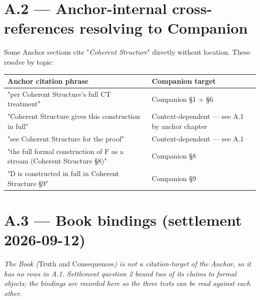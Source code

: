 \documentclass[11pt, openany]{book}
\newcommand{\sectionbreak}{\clearpage}
\begin{document}
\section{A.2 --- Anchor-internal cross-references resolving to Companion}

Some Anchor sections cite "\textit{Coherent Structure}" directly without location. These resolve by topic:

\begingroup\setlength{\tabcolsep}{3pt}\renewcommand{\arraystretch}{1.15}\footnotesize
\begin{center}
\begin{tabular}{p{2.69in} p{1.70in}}
\toprule
Anchor citation phrase & Companion target \\
\midrule
"per Coherent Structure's full CT treatment" & Companion §1 + §6 \\
"Coherent Structure gives this construction in full" & Context-dependent --- see A.1 by anchor chapter \\
"see Coherent Structure for the proof" & Context-dependent --- see A.1 \\
"the full formal construction of F as a stream (Coherent Structure §8)" & Companion §8 \\
"D is constructed in full in Coherent Structure §9" & Companion §9 \\
\bottomrule
\end{tabular}
\end{center}
\endgroup
\sectionbreak

\section{A.3 --- Book bindings (settlement 2026-09-12)}

\textit{The Book (}Truth and Consequences\textit{) is not a citation-target of the Anchor, so it has no rows in A.1. Settlement question 2 bound two of its claims to formal objects; the bindings are recorded here so the three texts can be read against each other.}
\end{document}
